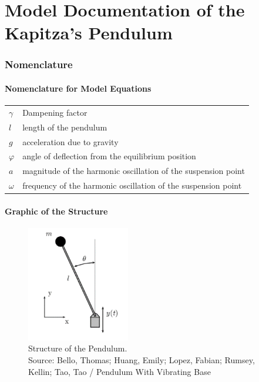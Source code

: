\documentclass[10pt,a4paper]{article}
\begin{document}
	\part*{Model Documentation of the \\ Kapitza's Pendulum} %
	
	
	\section{Nomenclature} %
	\subsection{Nomenclature for Model Equations} %
	
	\begin{tabular}{ll}
		$\gamma$ & Dampening factor \\
		$l$ & length of the pendulum \\
		$g$ & acceleration due to gravity \\
		$\varphi$ & angle of deflection from the equilibrium position \\
		$a$ & magnitude of the harmonic oscillation of the suspension point \\
		$\omega$ & frequency of the harmonic oscillation of the suspension point
				
	\end{tabular}
	 
	
	\subsection{Graphic of the Structure}	
	\begin{figure}[H]
		\centering
		\captionsetup{justification=centering, margin=1cm}
		\includegraphics[width=45mm]{kapitza_pendulum.pdf}
		\caption{Structure of the Pendulum. \\ \footnotesize{Source: Bello, Thomas; Huang, Emily; Lopez, Fabian; Rumsey, Kellin; Tao, Tao / Pendulum With Vibrating Base}}
	\end{figure}
	
\end{document}
